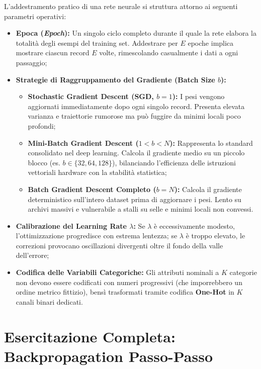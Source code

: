 L'addestramento pratico di una rete neurale si struttura attorno ai seguenti parametri operativi:
\begin{itemize}
    \item \textbf{Epoca (\textit{Epoch}):} Un singolo ciclo completo durante il quale la rete elabora la totalità degli esempi del training set. Addestrare per $E$ epoche implica mostrare ciascun record $E$ volte, rimescolando casualmente i dati a ogni passaggio;
    \item \textbf{Strategie di Raggruppamento del Gradiente (Batch Size $b$):}
    \begin{itemize}
        \item \textbf{Stochastic Gradient Descent (SGD, $b=1$):} I pesi vengono aggiornati immediatamente dopo ogni singolo record. Presenta elevata varianza e traiettorie rumorose ma può fuggire da minimi locali poco profondi;
        \item \textbf{Mini-Batch Gradient Descent ($1 < b < N$):} Rappresenta lo standard consolidato nel deep learning. Calcola il gradiente medio su un piccolo blocco (es. $b \in \{32, 64, 128\}$), bilanciando l'efficienza delle istruzioni vettoriali hardware con la stabilità statistica;
        \item \textbf{Batch Gradient Descent Completo ($b=N$):} Calcola il gradiente deterministico sull'intero dataset prima di aggiornare i pesi. Lento su archivi massivi e vulnerabile a stalli su selle e minimi locali non convessi.
    \end{itemize}
    \item \textbf{Calibrazione del Learning Rate $\lambda$:} Se $\lambda$ è eccessivamente modesto, l'ottimizzazione progredisce con estrema lentezza; se $\lambda$ è troppo elevato, le correzioni provocano oscillazioni divergenti oltre il fondo della valle dell'errore;
    \item \textbf{Codifica delle Variabili Categoriche:} Gli attributi nominali a $K$ categorie non devono essere codificati con numeri progressivi (che imporrebbero un ordine metrico fittizio), bensì trasformati tramite codifica \textbf{One-Hot} in $K$ canali binari dedicati.
\end{itemize}

\FloatBarrier
\section{Esercitazione Completa: Backpropagation Passo-Passo}
\label{sec:dm-backprop-worked-example}


